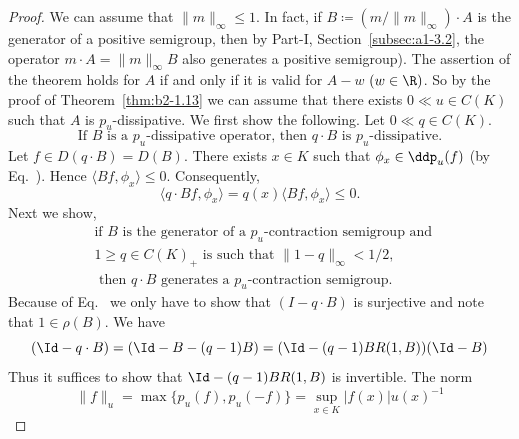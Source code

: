 \begin{proof}
We can assume that $\|m\|_{\infty} \leq 1$.
In fact, if\/ $B \coloneqq (m/\|m\|_{\infty}) \cdot A$ is the generator of a positive semigroup, then by 
Part-I, Section~\ref{subsec:a1-3.2}, the operator $m \cdot A = \|m\|_{\infty}B$ also generates a positive semigroup).
The assertion of the theorem holds for $A$ if and only if it is valid for $A - w$ $(w \in \R)$.
So by the proof of Theorem~\ref{thm:b2-1.13} we can assume that there exists $0 \ll u \in C(K)$ such that $A$ is $p_{u}$-dissipative.
We first show the following. Let $0 \ll q \in C(K)$.
\begin{equation}\label{eq:b2-1.11}
\text{If } B \text{ is a } p_{u}\text{-dissipative operator, then } q \cdot B \text{ is } p_{u}\text{-dissipative.}
\end{equation}
Let $f \in D(q \cdot B) = D(B)$.
There exists $x \in K$ such that $\phi_{x} \in \ddp_{u}(f)$ (by Eq.~). 
Hence $\langle Bf,\phi_{x} \rangle \leq 0$.
Consequently, 
%
\[
	\langle q \cdot Bf,\phi_{x} \rangle = q(x)\langle Bf,\phi_{x} \rangle \leq 0 .
\]
%
Next we show,
\begin{equation}\label{eq:b2-1.12}
\begin{split}
&\text{if } B \text{ is the generator of a } p_{u}\text{-contraction semigroup and } \\
&1 \geq q \in C(K)_{+} \text{ is such that } \|1 - q\|_{\infty} < 1/2,  \\
&\text{ then } q \cdot B \text{ generates a } p_{u}\text{-contraction semigroup.}
\end{split}
\end{equation}
Because of Eq.~ we only have to show that 
$(I - q \cdot B)$ is surjective and note that $1 \in \rho(B)$.
We have 
\[
	( \Id - q \cdot B) = (\Id - B - (q-1)B) = (\Id - (q-1)BR(1,B))(\Id - B)
\]
Thus it suffices to show that $\Id - (q-1)BR(1,B)$ is invertible.
The norm 
\[
	\|f\|_{u} = \max\{p_{u}(f), p_{u}(-f) \} = \sup_{x \in K} |f(x)| u(x)^{-1}
\]
\end{proof}
